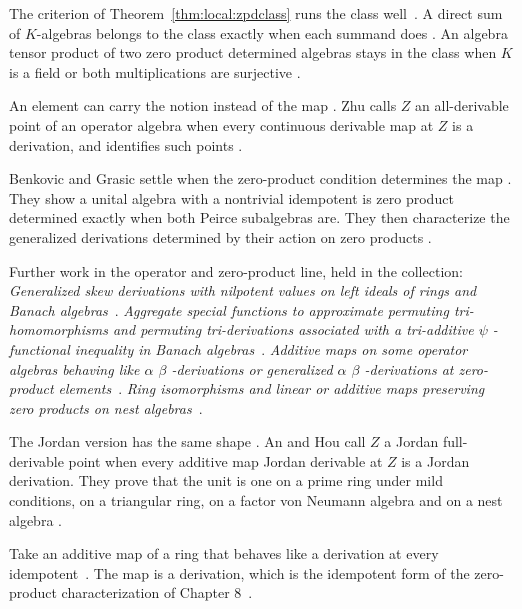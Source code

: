 The criterion of Theorem~\ref{thm:local:zpdclass} runs the class well~\cite[Theorem~4.3, pp.~331--332]{BriceHuang2015}. A
direct sum of $K$-algebras belongs to the class exactly when each summand
does \cite[Theorem~3.1, p.~330]{BriceHuang2015}. An algebra tensor product
of two zero product determined algebras stays in the class when $K$ is a
field or both multiplications are surjective
\cite[Theorem~4.3, pp.~331--332]{BriceHuang2015}.

An element can carry the notion instead of the map
\cite[Abstract]{Zhu2007AllDerivable}. Zhu calls $Z$ an all-derivable point of
an operator algebra when every continuous derivable map at $Z$ is a
derivation, and identifies such points \cite[Abstract]{Zhu2007AllDerivable}.

Benkovic and Grasic settle when the zero-product condition determines the map
\cite[pp.~347--368]{BenkovicGrasic2014Generalized}. They show a unital algebra
with a nontrivial idempotent is zero product determined exactly when both
Peirce subalgebras are. They then characterize the generalized derivations
determined by their action on zero products
\cite[pp.~347--368]{BenkovicGrasic2014Generalized}.

Further work in the operator and zero-product line, held in the collection:
\noindent\emph{Generalized skew derivations with nilpotent values on left
ideals of rings and Banach
algebras}~\cite{LibGeneralizedSkewDerivationsWith2014}.
\noindent\emph{Aggregate special functions to approximate permuting
tri-homomorphisms and permuting tri-derivations associated with a tri-additive
$\psi$ -functional inequality in Banach
algebras}~\cite{LibAggregateSpecialFunctionsTo2024}. \noindent\emph{Additive
maps on some operator algebras behaving like $\alpha$ $\beta$ -derivations or
generalized $\alpha$ $\beta$ -derivations at zero-product
elements}~\cite{LibAdditiveMapsOnSome2014}. \noindent\emph{Ring isomorphisms
and linear or additive maps preserving zero products on nest
algebras}~\cite{LibRingIsomorphismsAndLinear2004}.

The Jordan version has the same shape \cite[Abstract,
p.~753]{AnHou2010JordanFullDerivable}. An and Hou call $Z$ a Jordan
full-derivable point when every additive map Jordan derivable at $Z$ is a
Jordan derivation. They prove that the unit is one on a prime ring under mild
conditions, on a triangular ring, on a factor von Neumann algebra and on a
nest algebra \cite[Abstract, p.~753]{AnHou2010JordanFullDerivable}.

Take an additive map of a ring that behaves like a derivation at every
idempotent~\cite{WlAdditiveMapsOnRingsBehavingLik2011}. The map is a derivation, which is the idempotent form of the
zero-product
characterization of Chapter 8~\cite{WlAdditiveMapsOnRingsBehavingLik2011}.

